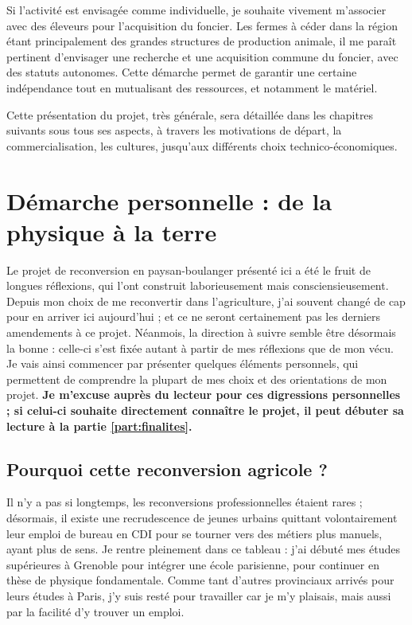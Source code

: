 \documentclass{book}
\begin{document}
Si l'activité est envisagée comme individuelle, je souhaite vivement m'associer avec des éleveurs pour l'acquisition du foncier. Les fermes à céder dans la région étant principalement des grandes structures de production animale, il me paraît pertinent d'envisager une recherche et une acquisition commune du foncier, avec des statuts autonomes. Cette démarche permet de garantir une certaine indépendance tout en mutualisant des ressources, et notamment le matériel.

Cette présentation du projet, très générale, sera détaillée dans les chapitres suivants sous tous ses aspects, à travers les motivations de départ, la commercialisation, les cultures, jusqu'aux différents choix technico-économiques.

\section{Démarche personnelle : de la physique à la terre}

Le projet de reconversion en paysan-boulanger présenté ici a été le fruit de longues réflexions, qui l'ont construit laborieusement mais consciensieusement. Depuis mon choix de me reconvertir dans l'agriculture, j'ai souvent changé de cap pour en arriver ici aujourd'hui ; et ce ne seront certainement pas les derniers amendements à ce projet. Néanmois, la direction à suivre semble être désormais la bonne : celle-ci s'est fixée autant à partir de mes réflexions que de mon vécu. Je vais ainsi commencer par présenter quelques éléments personnels, qui permettent de comprendre la plupart de mes choix et des orientations de mon projet.\textbf{ Je m'excuse auprès du lecteur pour ces digressions personnelles ; si celui-ci souhaite directement connaître le projet, il peut débuter sa lecture à la partie \ref{part:finalites}.}

\subsection{Pourquoi cette reconversion agricole ?}

Il n'y a pas si longtemps, les reconversions professionnelles étaient rares ; désormais, il existe une recrudescence de jeunes urbains quittant volontairement leur emploi de bureau en CDI pour se tourner vers des métiers plus manuels, ayant plus de sens. Je rentre pleinement dans ce tableau : j'ai débuté mes études supérieures à Grenoble pour intégrer une école parisienne, pour continuer en thèse de physique fondamentale. Comme tant d'autres provinciaux arrivés pour leurs études à Paris, j'y suis resté pour travailler car je m'y plaisais, mais aussi par la facilité d'y trouver un emploi.
\end{document}
